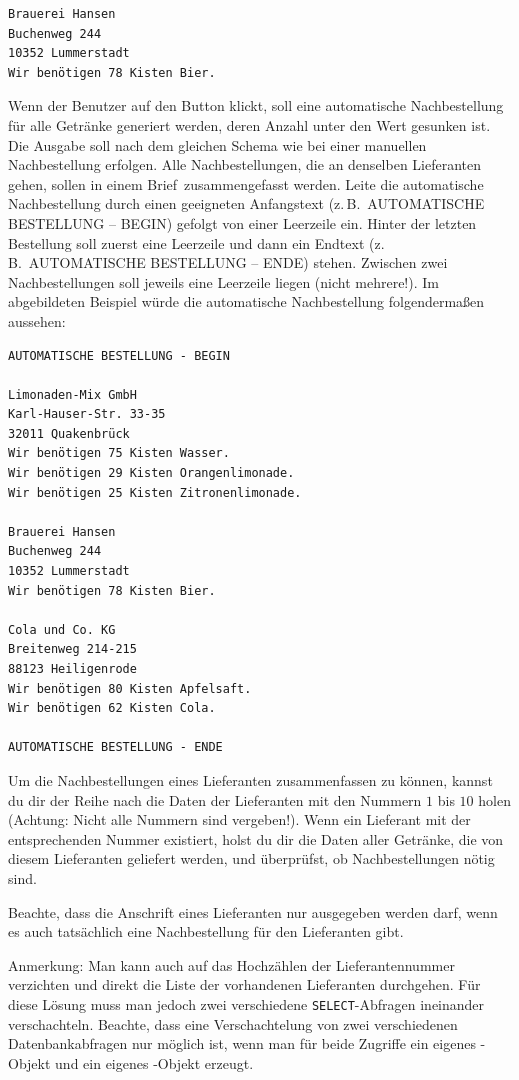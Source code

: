 \begin{compactenum}[a)]
\begin{verbatim}
Brauerei Hansen
Buchenweg 244
10352 Lummerstadt
Wir benötigen 78 Kisten Bier.
\end{verbatim}

Wenn der Benutzer auf den Button 
klickt, soll eine automatische Nachbestellung für alle Getränke generiert
werden, deren Anzahl unter den Wert  gesunken ist. Die
Ausgabe soll nach dem gleichen Schema wie bei einer manuellen Nachbestellung
erfolgen. Alle Nachbestellungen, die an denselben Lieferanten gehen, sollen in
einem \glqq Brief\grqq\ zusammengefasst werden. Leite die automatische Nachbestellung
durch einen geeigneten Anfangstext (z.\,B.\ \glqq AUTOMATISCHE BESTELLUNG -- BEGIN\grqq )
gefolgt von einer Leerzeile ein. Hinter der letzten Bestellung soll zuerst eine
Leerzeile und dann ein Endtext (z.\,B.\ \glqq AUTOMATISCHE BESTELLUNG -- ENDE\grqq ) stehen.
Zwischen zwei Nachbestellungen soll jeweils eine Leerzeile liegen (nicht
mehrere!). Im abgebildeten Beispiel würde die automatische Nachbestellung
folgendermaßen aussehen:

\pagebreak

\begin{verbatim}
AUTOMATISCHE BESTELLUNG - BEGIN

Limonaden-Mix GmbH
Karl-Hauser-Str. 33-35
32011 Quakenbrück
Wir benötigen 75 Kisten Wasser.
Wir benötigen 29 Kisten Orangenlimonade.
Wir benötigen 25 Kisten Zitronenlimonade.

Brauerei Hansen
Buchenweg 244
10352 Lummerstadt
Wir benötigen 78 Kisten Bier.

Cola und Co. KG
Breitenweg 214-215
88123 Heiligenrode
Wir benötigen 80 Kisten Apfelsaft.
Wir benötigen 62 Kisten Cola.

AUTOMATISCHE BESTELLUNG - ENDE
\end{verbatim}

Um die Nachbestellungen eines Lieferanten zusammenfassen zu können, kannst du
dir der Reihe nach die Daten der Lieferanten mit den Nummern $1$ bis $10$ holen
(Achtung: Nicht alle Nummern sind vergeben!). Wenn ein Lieferant mit der
entsprechenden Nummer existiert, holst du dir die Daten aller Getränke, die von
diesem Lieferanten geliefert werden, und überprüfst, ob Nachbestellungen nötig
sind.

Beachte, dass die Anschrift eines Lieferanten nur ausgegeben werden darf, wenn
es auch tatsächlich eine Nachbestellung für den Lieferanten gibt.

Anmerkung: Man kann auch auf das Hochzählen der Lieferantennummer verzichten
und direkt die Liste der vorhandenen Lieferanten durchgehen. Für diese Lösung
muss man jedoch zwei verschiedene \lstinline|SELECT|-Abfragen ineinander
verschachteln. Beachte, dass eine Verschachtelung von zwei verschiedenen
Datenbankabfragen nur möglich ist, wenn man für beide Zugriffe ein eigenes
-Objekt und ein eigenes -Objekt erzeugt.
\end{compactenum}
